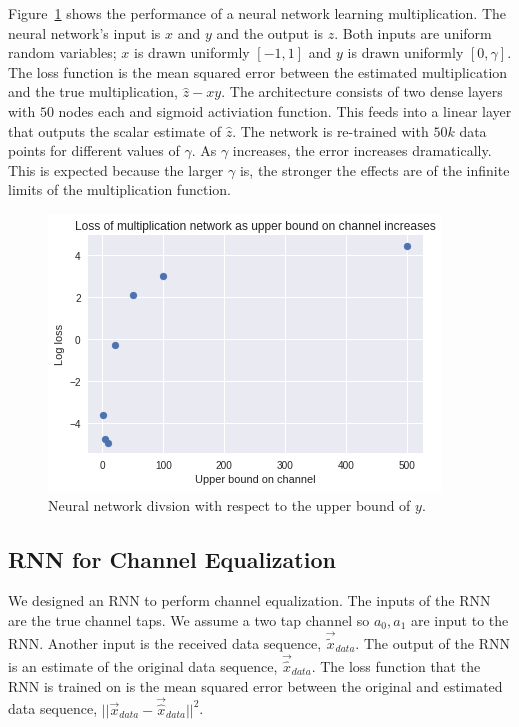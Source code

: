 Figure~\ref{fig:mult_bound} shows the performance of a neural network learning multiplication.
The neural network's input is $x$ and $y$ and the output is $\hat{z}$.  Both inputs are uniform random variables; $x$ is drawn uniformly $[-1,1]$ and $y$ is drawn uniformly $[0,\gamma]$. 
The loss function is the mean squared error between the estimated multiplication and the true multiplication, $\hat{z}-xy$.
The architecture consists of two dense layers with $50$ nodes each and sigmoid activiation function.  This feeds into a linear layer that outputs the scalar estimate of $\hat{z}$.  
The network is re-trained with $50k$ data points for different values of $\gamma$. As $\gamma$ increases, the error increases dramatically.  This is expected because the larger $\gamma$ is, the stronger the effects are of the infinite limits of the multiplication function.

\begin{figure}
\begin{center}
\includegraphics{figures/equal/Channel_upper_bound_multiplication.png}
\caption{Neural network divsion with respect to the upper bound of $y$.}
\label{fig:mult_bound}
\end{center}
\end{figure}

\subsection{RNN for Channel Equalization}

We designed an RNN to perform channel equalization.
The inputs of the RNN are the true channel taps.  We assume a two tap channel so $a_0, a_1$ are input to the RNN.  Another input is the received data sequence, $\vec{\tilde{x}}_{data}$.
The output of the RNN is an estimate of the original data sequence, $\vec{\hat{x}}_{data}$. 
The loss function that the RNN is trained on is the mean squared error between the original and estimated data sequence, $||\vec{x}_{data}-\vec{\hat{x}}_{data}||^2$.

